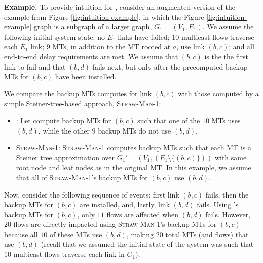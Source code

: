 {\bf \mf Example.} To provide intuition for \mfs, consider an augmented version of the example from Figure \ref{fig:intuition-example}, in which the  Figure \ref{fig:intuition-example} graph is
a subgraph of a larger graph, $G_1=(V_1,E_1)$. We assume the following initial system state: no $E_1$ links have failed;  $10$ multicast flows traverse each $E_1$ link;
$9$ MTs, in addition to the MT rooted at $a$, use link $(b,c)$; and all end-to-end delay requirements are met.
We assume that $(b,c)$ is the the first link to fail and that $(b,d)$ fails next, but only after the precomputed backup MTs for $(b,c)$ have been installed.

We compare the backup MTs \mf computes for link $(b,c)$ with those computed by a simple Steiner-tree-based approach, \textsc{Straw-Man-1}:
\begin{itemize}
	\item \underline{\mfs}: Let \mf compute backup MTs for $(b,c)$ such that one of the $10$ MTs uses $(b,d)$, while the other $9$ backup MTs do not use $(b,d)$. 

	\item \underline{\textsc{Straw-Man-1}}: \textsc{Straw-Man-1} computes backup MTs such that each MT is a Steiner tree approximation over 
	$G_1' = \left(V_1,\left(E_1 \setminus \{(b,c)\} \right) \right)$ with 
	same root node and leaf nodes as in the original MT. In this example, we assume that all of \textsc{Straw-Man-1}'s backup MTs for $(b,c)$ use $(b,d)$. 

\end{itemize}	
Now, consider the following sequence of events: first link $(b,c)$ fails, then the backup MTs for $(b,c)$ are installed, and, lastly, link $(b,d)$ fails.   
Using \mfs's backup MTs for $(b,c)$, only $11$ flows are affected when $(b,d)$ fails.  However, $20$ flows are
directly impacted using \textsc{Straw-Man-1}'s backup MTs for $(b,c)$ because all $10$ of these MTs use $(b,d)$, making $20$ total MTs (and flows) 
that use $(b,d)$ (recall that we assumed the initial state of the system was such that $10$ multicast flows traverse each link in $G_1$).
 

